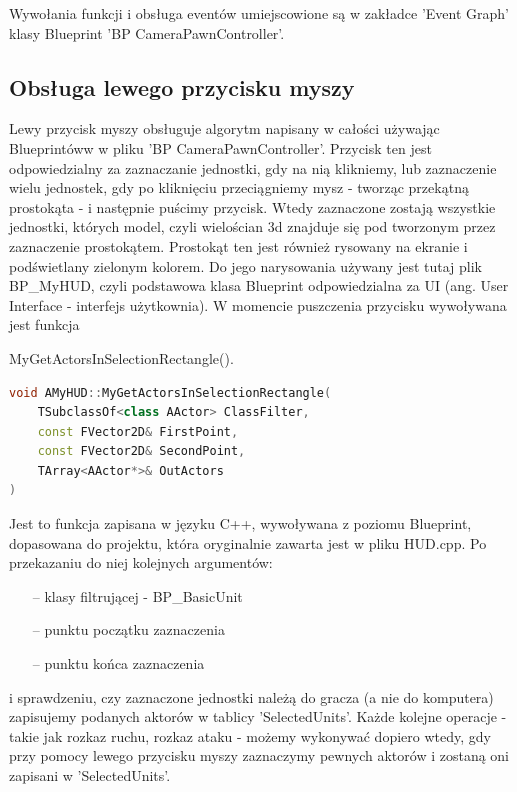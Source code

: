\documentclass[12pt]{report}
\begin{document}
Wywołania funkcji i obsługa eventów umiejscowione są w zakładce 'Event Graph' klasy Blueprint 'BP CameraPawnController'.

\subsection{Obsługa lewego przycisku myszy}

Lewy przycisk myszy obsługuje algorytm napisany w całości używając Blueprintóww w pliku 'BP CameraPawnController'. Przycisk ten jest odpowiedzialny za zaznaczanie jednostki, gdy na nią klikniemy, lub zaznaczenie wielu jednostek, gdy po kliknięciu przeciągniemy mysz - tworząc przekątną prostokąta - i następnie puścimy przycisk. Wtedy zaznaczone zostają wszystkie jednostki, których model, czyli wielościan 3d znajduje się pod tworzonym przez zaznaczenie prostokątem. Prostokąt ten jest również rysowany na ekranie i podświetlany zielonym kolorem. Do jego narysowania używany jest tutaj plik BP\_MyHUD, czyli podstawowa klasa Blueprint odpowiedzialna za UI (ang. User Interface - interfejs użytkownia). W momencie puszczenia przycisku wywoływana jest funkcja 

MyGetActorsInSelectionRectangle().
\begin{lstlisting}[language=C++, backgroundcolor=\color{black!5}, basicstyle=\footnotesize, caption=Funkcja MyGetActorsInSelectionRectangle() w klasie MyHUD.]
void AMyHUD::MyGetActorsInSelectionRectangle(
    TSubclassOf<class AActor> ClassFilter, 
    const FVector2D& FirstPoint, 
    const FVector2D& SecondPoint, 
    TArray<AActor*>& OutActors
)
\end{lstlisting}

Jest to funkcja zapisana w języku C++, wywoływana z poziomu Blueprint, dopasowana do projektu, która oryginalnie zawarta jest w pliku HUD.cpp. Po przekazaniu do niej kolejnych argumentów: 
\begin{itemize}
\item[--] klasy filtrującej - BP\_BasicUnit
\item[--] punktu początku zaznaczenia 
\item[--] punktu końca zaznaczenia
\end{itemize}

i sprawdzeniu, czy zaznaczone jednostki należą do gracza (a nie do komputera) zapisujemy podanych aktorów w tablicy 'SelectedUnits'. Każde kolejne operacje - takie jak rozkaz ruchu, rozkaz ataku - możemy wykonywać dopiero wtedy, gdy przy pomocy lewego przycisku myszy zaznaczymy pewnych aktorów i zostaną oni zapisani w 'SelectedUnits'. 
\end{document}
